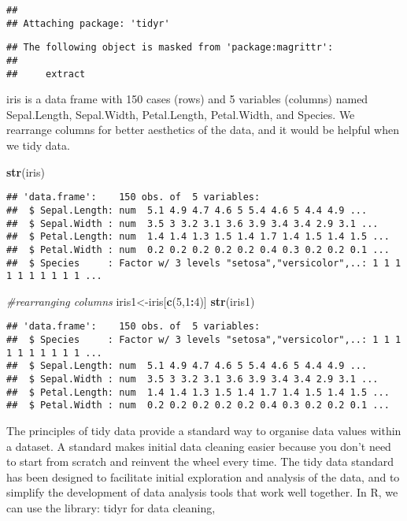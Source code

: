 \documentclass[
]{article}
\newenvironment{Shaded}{\begin{snugshade}}{\end{snugshade}}
\newcommand{\CommentTok}[1]{\textcolor[rgb]{0.56,0.35,0.01}{\textit{#1}}}
\newcommand{\DecValTok}[1]{\textcolor[rgb]{0.00,0.00,0.81}{#1}}
\newcommand{\KeywordTok}[1]{\textcolor[rgb]{0.13,0.29,0.53}{\textbf{#1}}}
\newcommand{\NormalTok}[1]{#1}
\newcommand{\OperatorTok}[1]{\textcolor[rgb]{0.81,0.36,0.00}{\textbf{#1}}}
\begin{document}
\begin{verbatim}
## 
## Attaching package: 'tidyr'
\end{verbatim}

\begin{verbatim}
## The following object is masked from 'package:magrittr':
## 
##     extract
\end{verbatim}

iris is a data frame with 150 cases (rows) and 5 variables (columns)
named Sepal.Length, Sepal.Width, Petal.Length, Petal.Width, and Species.
We rearrange columns for better aesthetics of the data, and it would be
helpful when we tidy data.

\begin{Shaded}
\begin{Highlighting}[]
\KeywordTok{str}\NormalTok{(iris)}
\end{Highlighting}
\end{Shaded}

\begin{verbatim}
## 'data.frame':    150 obs. of  5 variables:
##  $ Sepal.Length: num  5.1 4.9 4.7 4.6 5 5.4 4.6 5 4.4 4.9 ...
##  $ Sepal.Width : num  3.5 3 3.2 3.1 3.6 3.9 3.4 3.4 2.9 3.1 ...
##  $ Petal.Length: num  1.4 1.4 1.3 1.5 1.4 1.7 1.4 1.5 1.4 1.5 ...
##  $ Petal.Width : num  0.2 0.2 0.2 0.2 0.2 0.4 0.3 0.2 0.2 0.1 ...
##  $ Species     : Factor w/ 3 levels "setosa","versicolor",..: 1 1 1 1 1 1 1 1 1 1 ...
\end{verbatim}

\begin{Shaded}
\begin{Highlighting}[]
\CommentTok{#rearranging columns}
\NormalTok{iris1<-iris[}\KeywordTok{c}\NormalTok{(}\DecValTok{5}\NormalTok{,}\DecValTok{1}\OperatorTok{:}\DecValTok{4}\NormalTok{)]}
\KeywordTok{str}\NormalTok{(iris1)}
\end{Highlighting}
\end{Shaded}

\begin{verbatim}
## 'data.frame':    150 obs. of  5 variables:
##  $ Species     : Factor w/ 3 levels "setosa","versicolor",..: 1 1 1 1 1 1 1 1 1 1 ...
##  $ Sepal.Length: num  5.1 4.9 4.7 4.6 5 5.4 4.6 5 4.4 4.9 ...
##  $ Sepal.Width : num  3.5 3 3.2 3.1 3.6 3.9 3.4 3.4 2.9 3.1 ...
##  $ Petal.Length: num  1.4 1.4 1.3 1.5 1.4 1.7 1.4 1.5 1.4 1.5 ...
##  $ Petal.Width : num  0.2 0.2 0.2 0.2 0.2 0.4 0.3 0.2 0.2 0.1 ...
\end{verbatim}

The principles of tidy data provide a standard way to organise data
values within a dataset. A standard makes initial data cleaning easier
because you don't need to start from scratch and reinvent the wheel
every time. The tidy data standard has been designed to facilitate
initial exploration and analysis of the data, and to simplify the
development of data analysis tools that work well together. In R, we can
use the library: tidyr for data cleaning,
\end{document}

